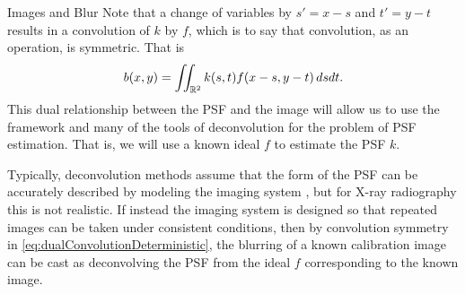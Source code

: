 \begin{chapter}{Images and Blur}
  Note that a change of variables by $s'=x-s$ and $t'=y-t$ results in a convolution of $k$ by $f$, which is to say that convolution, as an operation, is symmetric.
  That is
\begin{equation}\label{eq:dualConvolutionDeterministic}
  b(x,y) = \iint_{\mathbb R^2} k(s,t) f(x-s,y-t)\,dsdt.
\end{equation}
  This dual relationship between the PSF and the image will allow us to use the framework and many of the tools of deconvolution for the problem of PSF estimation.
  That is, we will use a known ideal $f$ to estimate the PSF $k$.

  Typically, deconvolution methods assume that the form of the PSF can be accurately described by modeling the imaging system \citep{jain1989,hansen2010}, but for X-ray radiography this is not realistic.
  If instead the imaging system is designed so that repeated images can be taken under consistent conditions, then by convolution symmetry in \eqref{eq:dualConvolutionDeterministic}, the blurring of a known calibration image can be cast as deconvolving the PSF from the ideal $f$ corresponding to the known image.


\end{chapter}
